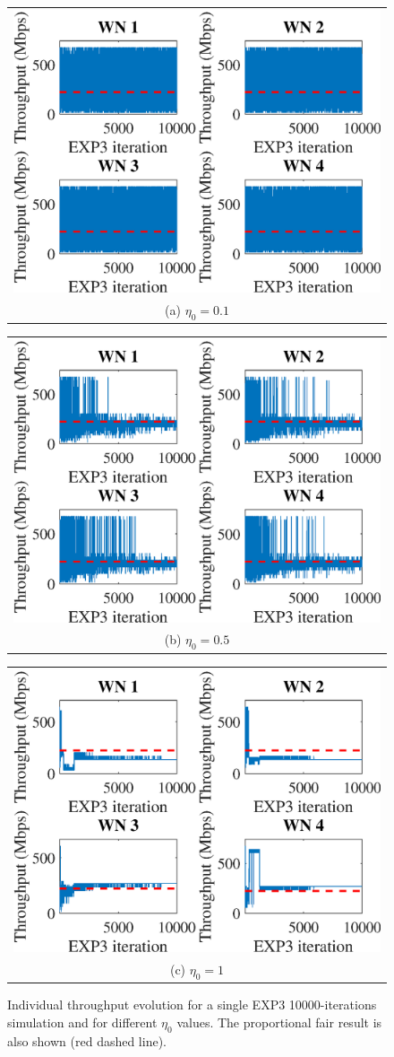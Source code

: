 \documentclass[preprint,12pt]{elsarticle}
\begin{document}
\begin{figure}
	\centering
	\begin{tabular}{@{}c@{}}
		\includegraphics[width=.3\textwidth]{images/NEW_temporal_individual_tpt_EXP3_eta01} \\[\abovecaptionskip]
		\small (a) $\eta_0 = 0.1$
		\label{fig:exp3_eta01_ind_tpt}
	\end{tabular}	
	\hspace{\floatsep}	
	\begin{tabular}{@{}c@{}}
		\includegraphics[width=.3\textwidth]{images/NEW_temporal_individual_tpt_EXP3_eta05} \\[\abovecaptionskip]
		\small (b) $\eta_0 = 0.5$
		\label{fig:exp3_eta05_ind_tpt}
	\end{tabular}
	\hspace{\floatsep}
	\begin{tabular}{@{}c@{}}
		\includegraphics[width=.3\textwidth]{images/NEW_temporal_individual_tpt_EXP3_eta1} \\[\abovecaptionskip]
		\small (c) $\eta_0 = 1$
		\label{fig:exp3_eta1_ind_tpt}
	\end{tabular}
	\caption{Individual throughput evolution for a single EXP3 10000-iterations simulation and for different $\eta_0$ values. The proportional fair result is also shown (red dashed line).}
	\label{fig:exp3_ind_tpt}
\end{figure}
\end{document}
